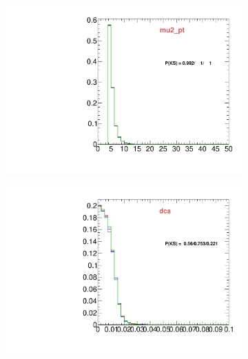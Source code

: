 \begin{figure}
\begin{subfigure}[b]{0.2\textwidth}
                \includegraphics[width=\textwidth]{Figures/VariablesComparison/Data_endcaps_figs_3h/mu2_pt}
                \label{fig:Data_endcaps_mu2_pt_3h}
        \end{subfigure}
        \begin{subfigure}[b]{0.2\textwidth}
                \centering
                \includegraphics[width=\textwidth]{Figures/VariablesComparison/Data_endcaps_figs_3h/dca}
                \label{fig:Data_endcaps_dca_3h}
        \end{subfigure}
        \begin{subfigure}[b]{0.2\textwidth}
                \centering

\end{subfigure}
\end{figure}
